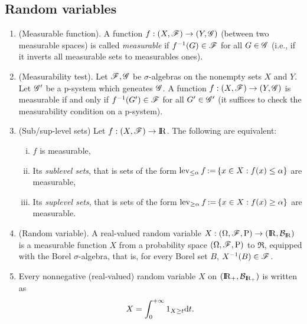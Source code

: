 \documentclass[a4paper,10pt]{article}
\begin{document}
\subsection{Random variables}\label{sec:random_variables}
\begin{enumerate}

 \item (Measurable function). A function $f:(X,\mathscr{F})\to (Y,\mathscr{G})$ (between two measurable spaces) is 
       called \textit{measurable} if $f^{-1}(G) \in \mathscr{F}$ for all $G\in\mathscr{G}$ (i.e., if it inverts all 
       measurable sets to measurables ones).
       
 \item (Measurability test). Let $\mathscr{F},\mathscr{G}$ be $\sigma$-algebras on the nonempty sets $X$ and $Y$. Let $\mathscr{G}'$ be 
       a p-system which geneates $\mathscr{G}$. A function $f: (X,\mathscr{F})\to (Y,\mathscr{G})$ is measurable 
       if and only if $f^{-1}(G')\in \mathscr{F}$ for all $G'\in\mathscr{G}'$ (it suffices to check the 
       measurability condition on a p-system).
 
 \item (Sub/sup-level sets) Let $f:(X,\F)\to \Re$. The following are equivalent:
      \begin{enumerate}[(i)]
       \item $f$ is measurable,
       \item Its \textit{sublevel sets}, that is
       sets of the form $\operatorname{lev}_{\leq \alpha} f {}\mathop{\mathrel{:}=}{} \{x\in X: f(x) \leq \alpha\}$ are measurable,
	\item Its \textit{suplevel sets},
       that is sets of the form $\operatorname{lev}_{ \geq \alpha} f {}\mathop{\mathrel{:}=}{} \{x\in X: f(x) \geq \alpha \}$ are 
       measurable. 
      \end{enumerate}

       
 \item \label{rv220000}
       (Random variable).
       A real-valued random variable $X:\ofp \to (\Re, \B_\Re)$ is a measurable function $X$
       from a probability space $(\Omega,\mathscr{F},\mathrm{P})$ to $\Re$, equipped with the Borel $\sigma$-algebra, that is, 
       for every Borel set $B$, $X^{-1}(B)\in\mathscr{F}$.              
       
 \item \label{rv221030}
 Every nonnegative (real-valued) random variable $X$ on $(\Re_+, \B_{{\Re}_+})$ 
 is written as 
 \[
  X = \int_0^{+\infty} 1_{X\geq t}\mathrm{d} t.
 \]


\end{enumerate}
\end{document}
